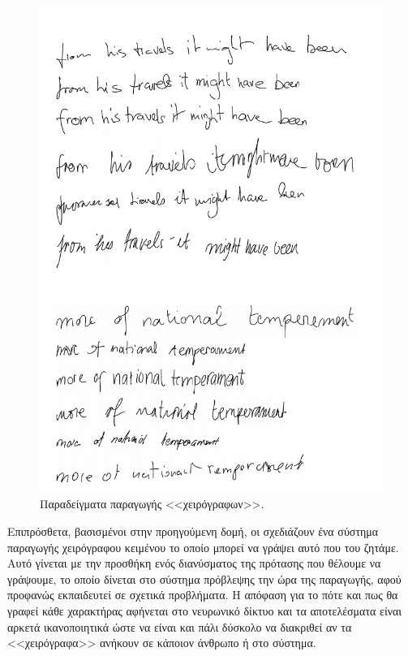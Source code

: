 \begin{figure}[tph]
	\includegraphics[width=\textwidth, keepaspectratio]{images/handwriting.png}
	\centering 
	\caption{Παραδείγματα παραγωγής <<χειρόγραφων>>.}
	\label{fig:training}
\end{figure}

Επιπρόσθετα, βασισμένοι στην προηγούμενη δομή, οι   σχεδιάζουν ένα σύστημα παραγωγής χειρόγραφου κειμένου το οποίο μπορεί να γράψει αυτό που του ζητάμε.
Αυτό γίνεται με την προσθήκη ενός διανύσματος της πρότασης που θέλουμε να γράψουμε, το οποίο δίνεται στο σύστημα πρόβλεψης την ώρα της παραγωγής, αφού προφανώς εκπαιδευτεί σε σχετικά προβλήματα.
Η απόφαση για το πότε και πως θα γραφεί κάθε χαρακτήρας αφήνεται στο νευρωνικό δίκτυο και τα αποτελέσματα είναι αρκετά ικανοποιητικά ώστε να είναι και πάλι δύσκολο να διακριθεί αν τα <<χειρόγραφα>> ανήκουν σε κάποιον άνθρωπο ή στο σύστημα.

